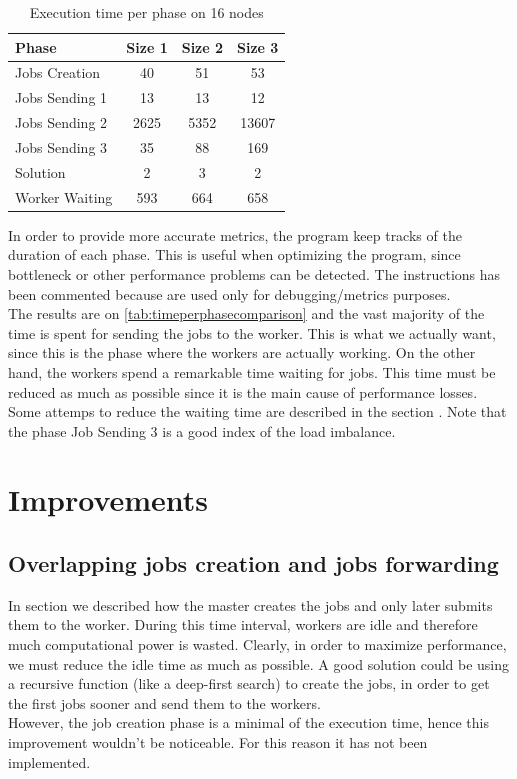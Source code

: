 \documentclass{article}
\begin{document}
\begin{table}
\centering
\begin{tabular}{|l|c|c|c|}
\hline
Phase & Size 1 & Size 2 & Size 3 \\ \hline
Jobs Creation & 40 & 51 & 53 \\ \hline 
Jobs Sending 1 & 13 & 13 & 12 \\ \hline 
Jobs Sending 2 & 2625 & 5352 & 13607 \\ \hline 
Jobs Sending 3 & 35 & 88 & 169 \\ \hline 
Solution & 2 & 3 & 2 \\ \hline 
Worker Waiting & 593 & 664 & 658 \\ \hline 
\end{tabular}
\caption{Execution time per phase on 16 nodes} \label{tab:timeperphasecomparison}
\end{table}
In order to provide more accurate metrics, the program keep tracks of the duration of each phase. This is useful when optimizing the program, since bottleneck or other performance problems can be detected. The instructions has been commented because are used only for debugging/metrics purposes. \\
The results are on \autoref{tab:timeperphasecomparison} and the vast majority of the time is spent for sending the jobs to the worker. This is what we actually want, since this is the phase where the workers are actually working. On the other hand, the workers spend a remarkable time waiting for jobs. This time must be reduced as much as possible since it is the main cause of performance losses. Some attemps to reduce the waiting time are described in the section . Note that the phase Job Sending 3 is a good index of the load imbalance.

\section{Improvements} \label{sec:improvements}

\subsection{Overlapping jobs creation and jobs forwarding}
In section  we described how the master creates the jobs and only later submits them to the worker. During this time interval, workers are idle and therefore much computational power is wasted. Clearly, in order to maximize performance, we must reduce the idle time as much as possible. A good solution could be using a recursive function (like a deep-first search) to create the jobs, in order to get the first jobs sooner and send them to the workers. \\
However, the job creation phase is a minimal of the execution time, hence this improvement wouldn't be noticeable. For this reason it has not been implemented.
\end{document}
